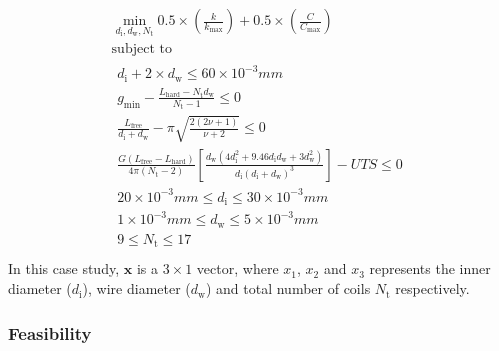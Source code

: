 \documentclass[10pt]{article}
\begin{document}
				\begin{equation}
					\begin{gathered}
	 					\min_{d_{\text{i}}, d_{\text{w}}, N_{\text{t}}} 0.5 \times\left(\frac{k}{k_{\text{max}}}\right) + 0.5 \times (\frac{C}{C_{\text{max}}}) \\
	 					\mbox{subject to} \\%
						\begin{split}
							 d_{\text{i}} + 2 \times d_{\text{w}} \leq 60 \times 10^{-3} mm\\
							 g_{\text{min}} - \frac{L_{\text{hard}} - N_{\text{t}}d_{\text{w}}}{N_{\text{t}}-1} \leq 0\\
							 \frac{L_{\text{free}}}{d_{\text{i}} + d_{\text{w}}} - \pi \sqrt{\frac{2(2 \nu + 1)}{\nu + 2}} \leq 0\\
							 \frac{G(L_{\text{free}} - L_{\text{hard}})}{4 \pi (N_{\text{t}} - 2) } \left[\frac{d_{\text{w}} (4d_{\text{i}}^{2} + 9.46d_{\text{i}} d_{\text{w}} + 3 d_{\text{w}}^{2})}{d_{\text{i}}(d_{\text{i}}+d_{\text{w}})^{3}}\right] - UTS \leq 0\\
							 20 \times 10^{-3} mm \leq d_{\text{i}} \leq 30 \times 10^{-3} mm\\
							 1 \times 10^{-3} mm \leq d_{\text{w}} \leq 5 \times 10^{-3} mm\\
							 9 \leq N_{\text{t}} \leq 17\\	 
						\end{split}
					\end{gathered}
					\label{eq:Case_1_Problem_Definition}	
				\end{equation}
In this case study, $\textbf{x}$ is a $3 \times 1$ vector, where $x_{1}$, $x_{2}$ and $x_{3}$ represents the inner diameter ($d_{\text{i}}$), wire diameter ($d_{\text{w}}$) and total number of coils $N_{\text{t}}$ respectively.


    
\newpage
	
	\subsubsection{Feasibility}
	
\end{document}
